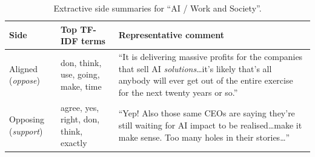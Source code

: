 \documentclass[11pt,a4paper]{article}
\begin{document}
\begin{table}[H]
\centering
\footnotesize
\caption{Extractive side summaries for ``AI / Work and Society''.}
\label{tab:stance-summary}
\renewcommand{\arraystretch}{1.2}
\begin{tabularx}{\linewidth}{p{1.8cm} p{4.2cm} X}
\toprule
\textbf{Side} & \textbf{Top TF-IDF terms} & \textbf{Representative comment} \\
\midrule
Aligned (\emph{oppose}) & don, think, use, going, make, time &
``It is delivering massive profits for the companies that sell AI \emph{solutions}\ldots it's likely that's all anybody will ever get out of the entire exercise for the next twenty years or so.'' \\[2pt]
Opposing (\emph{support}) & agree, yes, right, don, think, exactly &
``Yep! Also those same CEOs are saying they're still waiting for AI impact to be realised\ldots make it make sense. Too many holes in their stories\ldots'' \\
\bottomrule
\end{tabularx}
\end{table}
\end{document}
